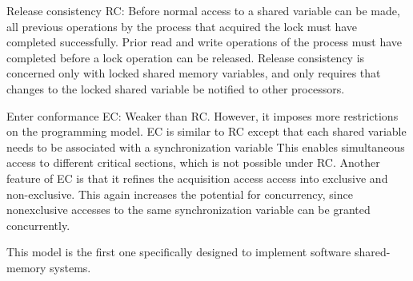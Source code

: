 \documentclass[a4paper,twoside]{scrbook}
\begin{document}
\par
Release consistency RC:
Before normal access to a shared variable can be made, all previous operations by the process that acquired the lock must have completed successfully. Prior read and write operations of the process must have completed before a lock operation can be released.
Release consistency is concerned only with locked shared memory variables, and only requires that changes to the locked shared variable be notified to other processors.
\par
Enter conformance EC:
Weaker than RC. However, it imposes more restrictions on the programming model. EC is similar to RC except that each shared variable needs to be associated with a synchronization variable
This enables simultaneous access to different critical sections, which is not possible under RC.
Another feature of EC is that it refines the acquisition access access into exclusive and non-exclusive. This again increases the potential for concurrency, since nonexclusive accesses to the same synchronization variable can be granted concurrently.

This model is the first one specifically designed to implement software shared-memory systems.

\renewcommand{\bibname}{Reference}


\end{document}
